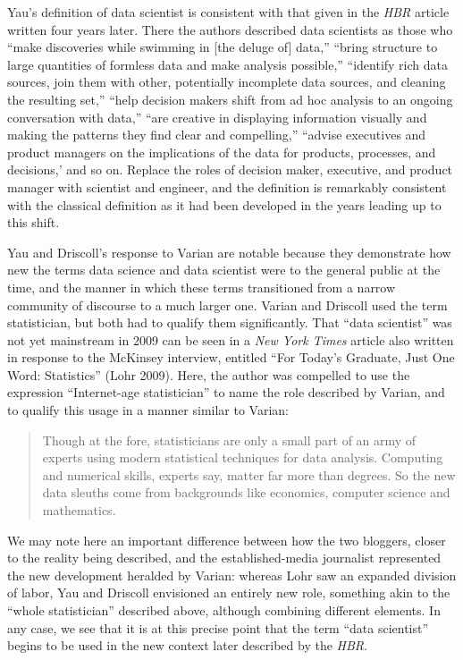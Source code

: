\documentclass[
  letterpaper,
]{report}
\begin{document}
Yau's definition of data scientist is consistent with that given in the
\emph{HBR} article written four years later. There the authors described
data scientists as those who ``make discoveries while swimming in {[}the
deluge of{]} data,'' ``bring structure to large quantities of formless
data and make analysis possible,'' ``identify rich data sources, join
them with other, potentially incomplete data sources, and cleaning the
resulting set,'' ``help decision makers shift from ad hoc analysis to an
ongoing conversation with data,'' ``are creative in displaying
information visually and making the patterns they find clear and
compelling,'' ``advise executives and product managers on the
implications of the data for products, processes, and decisions,' and so
on. Replace the roles of decision maker, executive, and product manager
with scientist and engineer, and the definition is remarkably consistent
with the classical definition as it had been developed in the years
leading up to this shift.

Yau and Driscoll's response to Varian are notable because they
demonstrate how new the terms data science and data scientist were to
the general public at the time, and the manner in which these terms
transitioned from a narrow community of discourse to a much larger one.
Varian and Driscoll used the term statistician, but both had to qualify
them significantly. That ``data scientist'' was not yet mainstream in
2009 can be seen in a \emph{New York Times} article also written in
response to the McKinsey interview, entitled ``For Today's Graduate,
Just One Word: Statistics'' (Lohr 2009). Here, the author was compelled
to use the expression ``Internet-age statistician'' to name the role
described by Varian, and to qualify this usage in a manner similar to
Varian:

\begin{quote}
Though at the fore, statisticians are only a small part of an army of
experts using modern statistical techniques for data analysis. Computing
and numerical skills, experts say, matter far more than degrees. So the
new data sleuths come from backgrounds like economics, computer science
and mathematics.
\end{quote}

We may note here an important difference between how the two bloggers,
closer to the reality being described, and the established-media
journalist represented the new development heralded by Varian: whereas
Lohr saw an expanded division of labor, Yau and Driscoll envisioned an
entirely new role, something akin to the ``whole statistician''
described above, although combining different elements. In any case, we
see that it is at this precise point that the term ``data scientist''
begins to be used in the new context later described by the \emph{HBR}.
\end{document}
